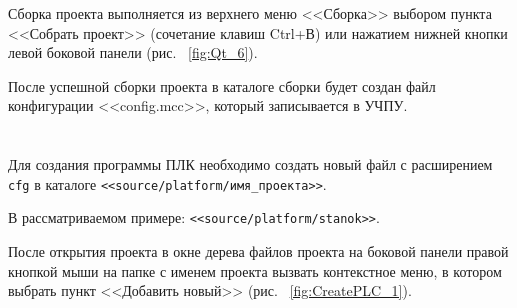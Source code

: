 Сборка проекта выполняется из верхнего меню <<Сборка>> выбором пункта <<Собрать проект>> (сочетание клавиш Ctrl+В) или нажатием нижней кнопки левой боковой панели (рис. ~\ref{fig:Qt_6}).\killoverfullbefore


После успешной сборки проекта в каталоге сборки будет создан файл конфигурации <<config.mcc>>, который записывается в УЧПУ.\killoverfullbefore

\section{}

Для создания программы ПЛК необходимо создать новый файл с расширением \texttt{cfg} в каталоге \texttt{<<source/platform/имя\_проекта>>}. \killoverfullbefore

В рассматриваемом примере: \texttt{<<source/platform/stanok>>}. \killoverfullbefore 

\begin{comment}
\begin{itemize}
\item в окне дерева файлов проекта на боковой панели правой кнопкой мыши на папке с именем проекта вызвать контекстное меню, в котором выбрать пункт <<Добавить новый>>;
\item в появившемся окне <<Новый файл>> выбрать шаблон <<С++>> и <<Файл исходных текстов С++>>;
\item в следующем окне <<Файл исходных текстов С++>> задать имя файла с расширением;
\item добавить файл в текущий проект. \killoverfullbefore \BL
\end{itemize} 
\end{comment}

После открытия проекта в окне дерева файлов проекта на боковой панели правой кнопкой мыши на папке с именем проекта вызвать контекстное меню, в котором выбрать пункт <<Добавить новый>> (рис. ~\ref{fig:CreatePLC_1}). \killoverfullbefore


